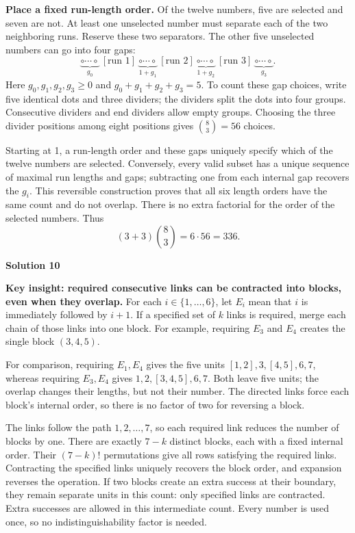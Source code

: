 \documentclass[11pt]{article}
\newcommand{\solution}[1]{%
  \par\Needspace{5\baselineskip}\addvspace{.8\baselineskip}%
  {\large\bfseries Solution #1\par}\nopagebreak[4]}
\begin{document}
\textbf{Place a fixed run-length order.} Of the twelve numbers, five
are selected and seven are not. At least one unselected number must
separate each of the two neighboring runs. Reserve these two separators.
The other five unselected numbers can go into four gaps:
\[
\underbrace{\circ\cdots\circ}_{g_0}\ [\text{run 1}]\
\underbrace{\circ\cdots\circ}_{1+g_1}\ [\text{run 2}]\
\underbrace{\circ\cdots\circ}_{1+g_2}\ [\text{run 3}]\
\underbrace{\circ\cdots\circ}_{g_3}.
\]
Here $g_0,g_1,g_2,g_3\geq0$ and $g_0+g_1+g_2+g_3=5$.
To count these gap choices, write five identical dots and three dividers;
the dividers split the dots into four groups. Consecutive dividers and
end dividers allow empty groups. Choosing the three divider positions
among eight positions gives $\binom83=56$ choices.

Starting at 1, a run-length order and these gaps uniquely specify which
of the twelve numbers are selected. Conversely, every valid subset has
a unique sequence of maximal run lengths and gaps; subtracting one from
each internal gap recovers the $g_i$. This reversible construction proves
that all six length orders have the same count and do not overlap.
There is no extra factorial for the order of the selected numbers.
Thus
\[
(3+3)\binom83=6\cdot56=\boxed{336}.
\]

\clearpage
\solution{10}
\textbf{Key insight: required consecutive links can be contracted into blocks,
even when they overlap.}
For each $i\in\{1,\ldots,6\}$, let $E_i$ mean that $i$ is immediately
followed by $i+1$. If a specified set of $k$ links is required, merge
each chain of those links into one block. For example, requiring $E_3$
and $E_4$ creates the single block $(3,4,5)$.

For comparison, requiring $E_1,E_4$ gives the five units
$[1,2],3,[4,5],6,7$, whereas requiring $E_3,E_4$ gives
$1,2,[3,4,5],6,7$. Both leave five units; the overlap changes their
lengths, but not their number. The directed links force each block's
internal order, so there is no factor of two for reversing a block.

The links follow the path $1,2,\ldots,7$, so each required link reduces
the number of blocks by one. There are exactly $7-k$ distinct blocks,
each with a fixed internal order. Their $(7-k)!$ permutations give all
rows satisfying the required links. Contracting the specified links uniquely recovers the block order,
and expansion reverses the operation. If two blocks create an extra
success at their boundary, they remain separate units in this count:
only specified links are contracted. Extra successes are allowed in
this intermediate count. Every number is used once, so no indistinguishability
factor is needed.
\end{document}
